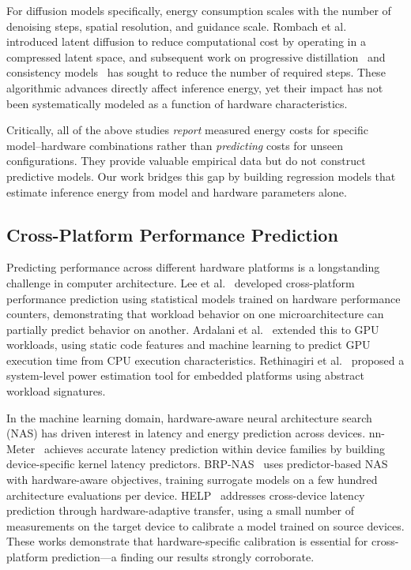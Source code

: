 \documentclass[preprint,review,12pt]{elsarticle}
\begin{document}
For diffusion models specifically, energy consumption scales with the number of denoising steps, spatial resolution, and guidance scale.
Rombach et al.~\cite{rombach2022high} introduced latent diffusion to reduce computational cost by operating in a compressed latent space, and subsequent work on progressive distillation~\cite{salimans2022progressive} and consistency models~\cite{song2023consistency} has sought to reduce the number of required steps.
These algorithmic advances directly affect inference energy, yet their impact has not been systematically modeled as a function of hardware characteristics.

Critically, all of the above studies \emph{report} measured energy costs for specific model--hardware combinations rather than \emph{predicting} costs for unseen configurations.
They provide valuable empirical data but do not construct predictive models.
Our work bridges this gap by building regression models that estimate inference energy from model and hardware parameters alone.

\subsection{Cross-Platform Performance Prediction}
\label{sec:rw_cross_platform}

Predicting performance across different hardware platforms is a longstanding challenge in computer architecture.
Lee et al.~\cite{lee2006accurate} developed cross-platform performance prediction using statistical models trained on hardware performance counters, demonstrating that workload behavior on one microarchitecture can partially predict behavior on another.
Ardalani et al.~\cite{ardalani2015cross} extended this to GPU workloads, using static code features and machine learning to predict GPU execution time from CPU execution characteristics.
Rethinagiri et al.~\cite{rethinagiri2014system} proposed a system-level power estimation tool for embedded platforms using abstract workload signatures.

In the machine learning domain, hardware-aware neural architecture search (NAS) has driven interest in latency and energy prediction across devices.
nn-Meter~\cite{zhang2021nnmeter} achieves accurate latency prediction within device families by building device-specific kernel latency predictors.
BRP-NAS~\cite{dudziak2020brpnas} uses predictor-based NAS with hardware-aware objectives, training surrogate models on a few hundred architecture evaluations per device.
HELP~\cite{lee2021help} addresses cross-device latency prediction through hardware-adaptive transfer, using a small number of measurements on the target device to calibrate a model trained on source devices.
These works demonstrate that hardware-specific calibration is essential for cross-platform prediction---a finding our results strongly corroborate.
\end{document}
